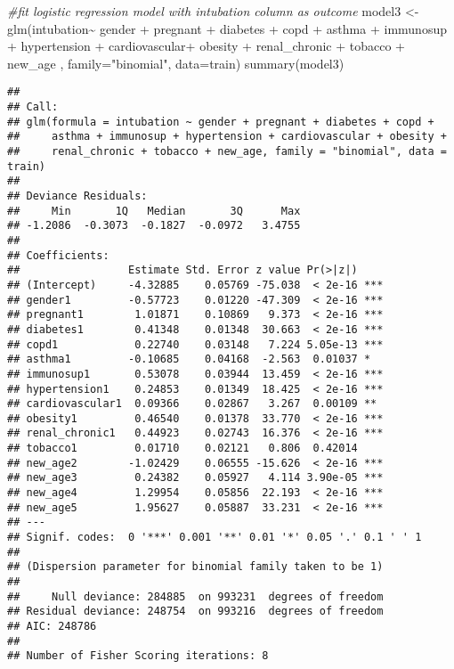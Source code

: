 \documentclass[
]{article}
\newenvironment{Shaded}{\begin{snugshade}}{\end{snugshade}}
\newcommand{\AttributeTok}[1]{\textcolor[rgb]{0.77,0.63,0.00}{#1}}
\newcommand{\CommentTok}[1]{\textcolor[rgb]{0.56,0.35,0.01}{\textit{#1}}}
\newcommand{\FunctionTok}[1]{\textcolor[rgb]{0.00,0.00,0.00}{#1}}
\newcommand{\NormalTok}[1]{#1}
\newcommand{\OtherTok}[1]{\textcolor[rgb]{0.56,0.35,0.01}{#1}}
\newcommand{\SpecialCharTok}[1]{\textcolor[rgb]{0.00,0.00,0.00}{#1}}
\newcommand{\StringTok}[1]{\textcolor[rgb]{0.31,0.60,0.02}{#1}}
\begin{document}
\begin{Shaded}
\begin{Highlighting}[]
\CommentTok{\#fit logistic regression model with intubation column as outcome}
\NormalTok{model3 }\OtherTok{\textless{}{-}} \FunctionTok{glm}\NormalTok{(intubation}\SpecialCharTok{\textasciitilde{}}\NormalTok{ gender }\SpecialCharTok{+}\NormalTok{ pregnant }\SpecialCharTok{+}\NormalTok{ diabetes }\SpecialCharTok{+}\NormalTok{ copd }\SpecialCharTok{+}\NormalTok{ asthma }\SpecialCharTok{+}\NormalTok{ immunosup }\SpecialCharTok{+}\NormalTok{ hypertension }\SpecialCharTok{+}\NormalTok{ cardiovascular}\SpecialCharTok{+} 
\NormalTok{                obesity }\SpecialCharTok{+}\NormalTok{ renal\_chronic }\SpecialCharTok{+}\NormalTok{ tobacco  }\SpecialCharTok{+}\NormalTok{ new\_age , }\AttributeTok{family=}\StringTok{"binomial"}\NormalTok{, }\AttributeTok{data=}\NormalTok{train)}
\FunctionTok{summary}\NormalTok{(model3)}
\end{Highlighting}
\end{Shaded}

\begin{verbatim}
## 
## Call:
## glm(formula = intubation ~ gender + pregnant + diabetes + copd + 
##     asthma + immunosup + hypertension + cardiovascular + obesity + 
##     renal_chronic + tobacco + new_age, family = "binomial", data = train)
## 
## Deviance Residuals: 
##     Min       1Q   Median       3Q      Max  
## -1.2086  -0.3073  -0.1827  -0.0972   3.4755  
## 
## Coefficients:
##                 Estimate Std. Error z value Pr(>|z|)    
## (Intercept)     -4.32885    0.05769 -75.038  < 2e-16 ***
## gender1         -0.57723    0.01220 -47.309  < 2e-16 ***
## pregnant1        1.01871    0.10869   9.373  < 2e-16 ***
## diabetes1        0.41348    0.01348  30.663  < 2e-16 ***
## copd1            0.22740    0.03148   7.224 5.05e-13 ***
## asthma1         -0.10685    0.04168  -2.563  0.01037 *  
## immunosup1       0.53078    0.03944  13.459  < 2e-16 ***
## hypertension1    0.24853    0.01349  18.425  < 2e-16 ***
## cardiovascular1  0.09366    0.02867   3.267  0.00109 ** 
## obesity1         0.46540    0.01378  33.770  < 2e-16 ***
## renal_chronic1   0.44923    0.02743  16.376  < 2e-16 ***
## tobacco1         0.01710    0.02121   0.806  0.42014    
## new_age2        -1.02429    0.06555 -15.626  < 2e-16 ***
## new_age3         0.24382    0.05927   4.114 3.90e-05 ***
## new_age4         1.29954    0.05856  22.193  < 2e-16 ***
## new_age5         1.95627    0.05887  33.231  < 2e-16 ***
## ---
## Signif. codes:  0 '***' 0.001 '**' 0.01 '*' 0.05 '.' 0.1 ' ' 1
## 
## (Dispersion parameter for binomial family taken to be 1)
## 
##     Null deviance: 284885  on 993231  degrees of freedom
## Residual deviance: 248754  on 993216  degrees of freedom
## AIC: 248786
## 
## Number of Fisher Scoring iterations: 8
\end{verbatim}
\end{document}

